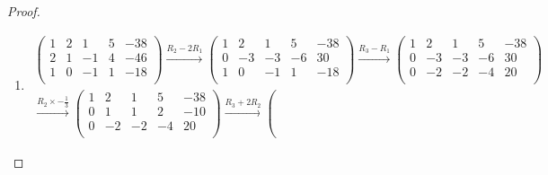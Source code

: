 \documentclass[prb,12pt]{revtex4-2}
\theoremstyle{definition}
\theoremstyle{definition}
\newenvironment{parts}{\begin{enumerate}[label=(\alph*)]}{\end{enumerate}}
\newcommand{\R}{\mathbb{R}}
\begin{document}
\begin{proof}
\begin{parts}
\[	.\]
	Sei dann $(x_1,x_2,x_3,x_4)^T\in \R^4$. Wenn $(x_1,x_2,x_3,x_4)^T\in \ker(A)$, gilt
	\begin{align*}
		t_3&:= x_3\\
		t_4&:= x_4\\
		x_1&=x_3-x_4=t_3-t_4\\
		x_2&=-x_3-2x_4=-t_3-2t_4
	\end{align*}
	Daraus folgt:
	\begin{align*}
	\ker(A)=\text{span}\left\{ \begin{pmatrix} 1 \\ -1 \\ 1 \\ 0 \end{pmatrix} ,\begin{pmatrix} -1 \\ -2 \\ 0 \\ 1 \end{pmatrix}  \right\} 
	\end{align*}	
\item 
	\begin{gather*}
\left(
\begin{array}{cccc|c}
 1 & 2 & 1 & 5 & -38 \\
 2 & 1 & -1 & 4 & -46 \\
 1 & 0 & -1 & 1 & -18 \\
\end{array}
\right) \xrightarrow{R_2-2R_1} \left(
\begin{array}{cccc|c}
 1 & 2 & 1 & 5 & -38 \\
 0 & -3 & -3 & -6 & 30 \\
 1 & 0 & -1 & 1 & -18 \\
\end{array}
\right) \xrightarrow{R_3-R_1} \left(
\begin{array}{cccc|c}
 1 & 2 & 1 & 5 & -38 \\
 0 & -3 & -3 & -6 & 30 \\
 0 & -2 & -2 & -4 & 20 \\
\end{array}
\right) \\\xrightarrow{R_2\times -\frac{1}{3}} \left(
\begin{array}{cccc|c}
 1 & 2 & 1 & 5 & -38 \\
 0 & 1 & 1 & 2 & -10 \\
 0 & -2 & -2 & -4 & 20 \\
\end{array}
\right) \xrightarrow{R_3+2R_2} \left(

\end{gather*}
\end{parts}
\end{proof}
\end{document}
